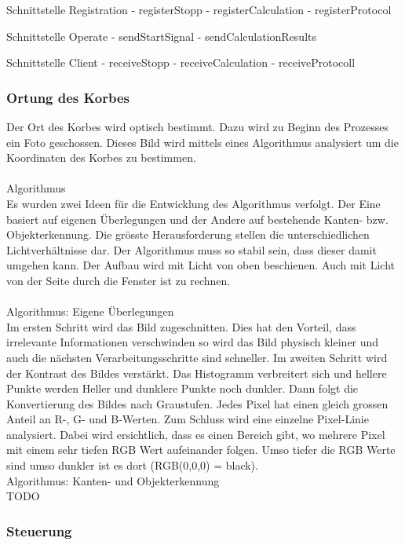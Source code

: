 Schnittstelle Registration
- registerStopp
- registerCalculation
- registerProtocol

Schnittstelle Operate
- sendStartSignal
- sendCalculationResults

Schnittstelle Client
- receiveStopp
- receiveCalculation
- receiveProtocoll

\subsubsection{Ortung des Korbes}
Der Ort des Korbes wird optisch bestimmt. Dazu wird zu Beginn des Prozesses ein Foto geschossen. Dieses Bild wird mittels eines Algorithmus analysiert um die Koordinaten des Korbes zu bestimmen.\\
\\
Algorithmus\\
Es wurden zwei Ideen für die Entwicklung des Algorithmus verfolgt. Der Eine basiert auf eigenen Überlegungen und der Andere auf bestehende Kanten- bzw. Objekterkennung. Die grösste Herausforderung stellen die unterschiedlichen Lichtverhältnisse dar. Der Algorithmus muss so stabil sein, dass dieser damit umgehen kann. Der Aufbau wird mit Licht von oben beschienen. Auch mit Licht von der Seite durch die Fenster ist zu rechnen.\\
\\
Algorithmus: Eigene Überlegungen\\
Im ersten Schritt wird das Bild zugeschnitten. Dies hat den Vorteil, dass irrelevante Informationen verschwinden so wird das Bild physisch kleiner und auch die nächsten Verarbeitungsschritte sind schneller. Im zweiten Schritt wird der Kontrast des Bildes verstärkt. Das Histogramm verbreitert sich und hellere Punkte werden Heller und dunklere Punkte noch dunkler. Dann folgt die Konvertierung des Bildes nach Graustufen. Jedes Pixel hat einen gleich grossen Anteil an R-, G- und B-Werten. Zum Schluss wird eine einzelne Pixel-Linie analysiert. Dabei wird ersichtlich, dass es einen Bereich gibt, wo mehrere Pixel mit einem sehr tiefen RGB Wert aufeinander folgen. Umso tiefer die RGB Werte sind umso dunkler ist es dort (RGB(0,0,0) = black).
\\
Algorithmus: Kanten- und Objekterkennung\\
TODO

\subsubsection{Steuerung}